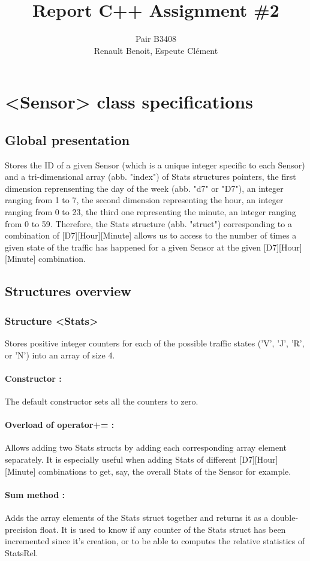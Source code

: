 \documentclass[10pt]{article}
\title{Report C++ Assignment \#2}
\author{Pair B3408 \\ {\sc Renault} Benoit, {\sc Espeute} Clément}
\date{}
\begin{document}
\pagestyle{fancy}
\maketitle
\section{<Sensor> class specifications}
\subsection{Global presentation}
Stores the ID of a given Sensor (which is a unique integer specific to each Sensor) and a tri-dimensional array (abb. "index") of Stats structures pointers, the first dimension reprensenting the day of the week (abb. "d7" or "D7"), an integer ranging from 1 to 7, the second dimension representing the hour, an integer ranging from 0 to 23, the third one representing the minute, an integer ranging from 0 to 59. Therefore, the Stats structure (abb. "struct") corresponding to a combination of [D7][Hour][Minute] allows us to access to the number of times a given state of the traffic has happened for a given Sensor at the given [D7][Hour][Minute] combination.

\subsection{Structures overview}
\subsubsection{Structure <Stats>}
Stores positive integer counters for each of the possible traffic states ('V', 'J', 'R', or 'N') into an array of size 4.

\paragraph{Constructor :}
The default constructor sets all the counters to zero.

\paragraph{Overload of operator+= :}
Allows adding two Stats structs by adding each corresponding array element separately. It is especially useful when adding Stats of different [D7][Hour][Minute] combinations to get, say, the overall Stats of the Sensor for example.

\paragraph{Sum method :}
Adds the array elements of the Stats struct together and returns it as a double-precision float. It is used to know if any counter of the Stats struct has been incremented since it's creation, or to be able to computes the relative statistics of StatsRel.
\end{document}
